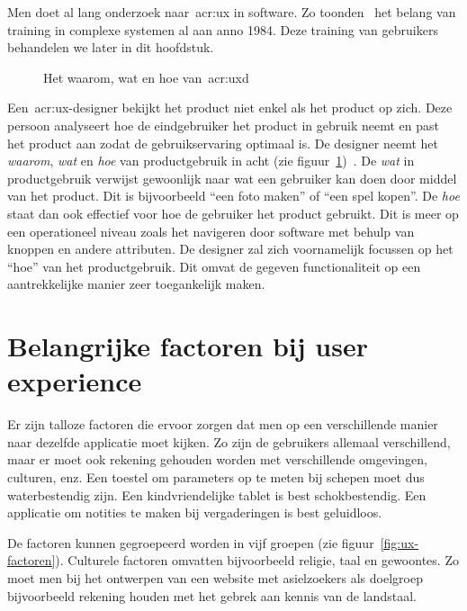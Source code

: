 Men doet al lang onderzoek naar~\acrlong{acr:ux} in software. Zo toonden~\textcite{Carroll1984} het belang van training in complexe systemen al aan anno 1984. Deze training van gebruikers behandelen we later in dit hoofdstuk.

\begin{figure}[h]
    \centering
    \def\svgwidth{.8\columnwidth}
    
    \caption{Het waarom, wat en hoe van~\acrlong{acr:uxd}}
    \label{fig:ux-waarom-wat-hoe}
\end{figure}

Een~\acrshort{acr:ux}-designer bekijkt het product niet enkel als het product op zich. Deze persoon analyseert hoe de eindgebruiker het product in gebruik neemt en past het product aan zodat de gebruikservaring optimaal is. De designer neemt het \textit{waarom}, \textit{wat} en \textit{hoe} van productgebruik in acht (zie figuur~\ref{fig:ux-waarom-wat-hoe})~\autocite{Hassenzahl2013}. De \textit{wat} in productgebruik verwijst gewoonlijk naar wat een gebruiker kan doen door middel van het product. Dit is bijvoorbeeld ``een foto maken'' of ``een spel kopen''. De \textit{hoe} staat dan ook effectief voor hoe de gebruiker het product gebruikt. Dit is meer op een operationeel niveau zoals het navigeren door software met behulp van knoppen en andere attributen. De designer zal zich voornamelijk focussen op het ``hoe'' van het productgebruik. Dit omvat de gegeven functionaliteit op een aantrekkelijke manier zeer toegankelijk maken.

\section{Belangrijke factoren bij user experience}
\label{sec:belangrijke-factoren-bij-user-experience}

Er zijn talloze factoren die ervoor zorgen dat men op een verschillende manier naar dezelfde applicatie moet kijken. Zo zijn de gebruikers allemaal verschillend, maar er moet ook rekening gehouden worden met verschillende omgevingen, culturen, enz. Een toestel om parameters op te meten bij schepen moet dus waterbestendig zijn. Een kindvriendelijke tablet is best schokbestendig. Een applicatie om notities te maken bij vergaderingen is best geluidloos.

De factoren kunnen gegroepeerd worden in vijf groepen (zie figuur~\ref{fig:ux-factoren}). Culturele factoren omvatten bijvoorbeeld religie, taal en gewoontes. Zo moet men bij het ontwerpen van een website met asielzoekers als doelgroep bijvoorbeeld rekening houden met het gebrek aan kennis van de landstaal.

